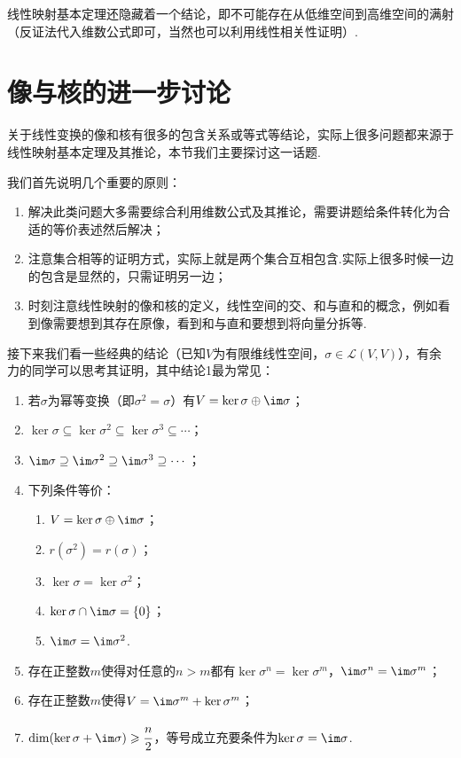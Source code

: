 线性映射基本定理还隐藏着一个结论，即不可能存在从低维空间到高维空间的满射（反证法代入维数公式即可，当然也可以利用线性相关性证明）.

\section{像与核的进一步讨论}
关于线性变换的像和核有很多的包含关系或等式等结论，实际上很多问题都来源于线性映射基本定理及其推论，本节我们主要探讨这一话题.

我们首先说明几个重要的原则：
\begin{enumerate}
    \item 解决此类问题大多需要综合利用维数公式及其推论，需要讲题给条件转化为合适的等价表述然后解决；

    \item 注意集合相等的证明方式，实际上就是两个集合互相包含.实际上很多时候一边的包含是显然的，只需证明另一边；

    \item 时刻注意线性映射的像和核的定义，线性空间的交、和与直和的概念，例如看到像需要想到其存在原像，看到和与直和要想到将向量分拆等.
\end{enumerate}

接下来我们看一些经典的结论（已知$V$为有限维线性空间，$\sigma\in \mathcal{L}(V,V)$），有余力的同学可以思考其证明，其中结论1最为常见：

\begin{enumerate}
    \item 若$\sigma$为幂等变换（即$\sigma^2=\sigma$）有$V=\ker\sigma\oplus\im \sigma$；

    \item $\ker\sigma \subseteq \ker\sigma^2 \subseteq \ker\sigma^3 \subseteq \cdots$；

    \item $\im \sigma \supseteq \im \sigma^2 \supseteq \im \sigma^3 \supseteq \cdots$；

    \item 下列条件等价：
    \begin{enumerate}[label=(\arabic*)]
        \item $V=\ker\sigma\oplus\im \sigma$；
        \item $r(\sigma^2)=r(\sigma)$；
        \item $\ker\sigma=\ker\sigma^2$；
        \item $\ker\sigma \cap \im \sigma=\{0\}$；
        \item $\im \sigma=\im \sigma^2$.
    \end{enumerate}

    \item 存在正整数$m$使得对任意的$n>m$都有$\ker\sigma^n=\ker\sigma^m$，$\im \sigma^n=\im \sigma^m$；

    \item 存在正整数$m$使得$V=\im \sigma^m+\ker\sigma^m$；

    \item $\dim(\ker\sigma+\im \sigma) \geqslant \cfrac{n}{2}$，等号成立充要条件为$\ker\sigma=\im \sigma$.
\end{enumerate}

